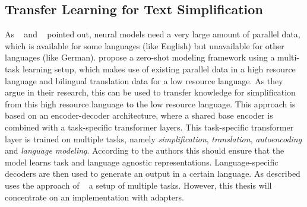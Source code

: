 \subsection{Transfer Learning for Text Simplification}
As ~\citet{Mallinson2020} and ~\citet{Pfeiffer2020} pointed out, neural models need a very large amount of parallel data, which is available for some languages (like English)
but unavailable for other languages (like German).
\citet{Mallinson2020} propose a zero-shot modeling framework using a multi-task learning setup, which makes use of existing parallel data in a high resource language
and bilingual translation data for a low resource language.
As they argue in their research, this can be used to transfer knowledge for simplification
from this high resource language to the low resource language.
This approach is based on an encoder-decoder architecture, where a shared base encoder is combined with a task-specific transformer layers.
This task-specific transformer layer is trained on multiple tasks, namely \emph{simplification}, \emph{translation}, \emph{autoencoding} and \emph{language modeling}.
According to the authors this should ensure that the model learns task and language agnostic representations.
Language-specific decoders are then used to generate an output in a certain language.
As described uses the approach of ~\citet{Mallinson2020} a setup of multiple tasks. However, this thesis will concentrate on an implementation with adapters.







